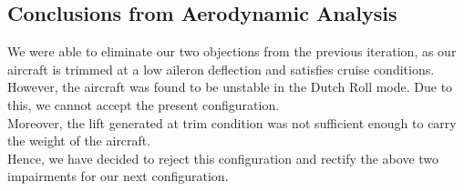 \subsection{Conclusions from Aerodynamic Analysis}
We were able to eliminate our two objections from the previous iteration, as our aircraft is trimmed at a low aileron deflection and satisfies cruise conditions.\\
However, the aircraft was found to be unstable in the Dutch Roll mode. Due to this, we cannot accept the present configuration.
\\
Moreover, the lift generated at trim condition was not sufficient enough to carry the weight of the aircraft.
\\
Hence, we have decided to reject this configuration and rectify the above two impairments for our next configuration.
\\
